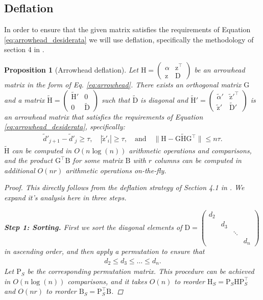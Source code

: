 \documentclass{article}
\newtheorem{proposition}{Proposition}[section]
\newcommand\vecz{\boldsymbol{\mathrm{z}}}
\newcommand\vecztilde{\widetilde{\boldsymbol{\mathrm{z}}}}
\newcommand\matB{\boldsymbol{\mathrm{B}}}
\newcommand\matD{\boldsymbol{\mathrm{D}}}
\newcommand\matG{\boldsymbol{\mathrm{G}}}
\newcommand\matH{\boldsymbol{\mathrm{H}}}
\newcommand\matP{\boldsymbol{\mathrm{P}}}
\newcommand\matDtilde{\widetilde{\boldsymbol{\mathrm{D}}}}
\newcommand\matHtilde{\widetilde{\boldsymbol{\mathrm{H}}}}
\begin{document}
\subsection{Deflation}
\label{appendix:arrowhead_deflation}
In order to ensure that the given matrix satisfies the requirements of Equation \eqref{eq:arrowhead_desiderata} we will use deflation, specifically the methodology of section 4 in \cite{gu1995divide}.

\begin{proposition}[Arrowhead deflation]
    \label{proposition:arrowhead_deflation}
    Let $\matH=\begin{pmatrix}
        \alpha & \vecz^\top \\
        \vecz & \matD
    \end{pmatrix}$ be an arrowhead matrix in the form of Eq. \eqref{eq:arrowhead}. There exists an orthogonal matrix $\matG$ and a matrix $\matHtilde=\begin{pmatrix}
        \matHtilde' & 0 \\
        0 & \matDtilde
    \end{pmatrix}$ such that $\matDtilde$ is diagonal and $\matHtilde'=
    \begin{pmatrix}
        \widetilde\alpha' & \vecztilde'^\top \\
        \vecztilde' & \matDtilde'
    \end{pmatrix}
    $
    is an arrowhead matrix that satisfies the requirements of Equation \eqref{eq:arrowhead_desiderata}, specifically:
    \begin{align*}
    \widetilde d'_{j+1}-\widetilde d'_j \geq \tau, \quad
    |\vecztilde'_i|\geq \tau,
    \quad
    \text{and}
    \quad
    \|\matH-\matG\matHtilde\matG^\top\|\leq n\tau.    
    \end{align*}
      $\matHtilde$ can be computed in $O(n\log(n))$ arithmetic operations and comparisons, and the product $\matG^\top\matB$ for some matrix $\matB$ with $r$ columns can be computed in additional $O(nr)$ arithmetic operations on-the-fly.
    \begin{proof}
        This directly follows from the deflation strategy of Section 4.1 in \cite{gu1995divide}. We expand it's analysis here in three steps.

        \textbf{Step 1: Sorting.}
        First we sort the diagonal elements of $\matD=\begin{pmatrix}
            d_2 & & & \\
                & d_3 & & \\
                & & \ddots & \\
                & & & d_n
        \end{pmatrix}$ in ascending order, and then apply a permutation to ensure that
        \begin{align*}
            d_2 \leq d_3 \leq \ldots \leq d_n.
        \end{align*} Let $\matP_S$ be the corresponding permutation matrix. This procedure can be achieved in $O(n\log(n))$ comparisons, and it takes $O(n)$ to reorder $\matH_S = \matP_S\matH\matP_S^\top$ and $O(nr)$ to reorder $\matB_S = \matP_S^\top\matB$.
        

\end{proof}
\end{proposition}
\end{document}
